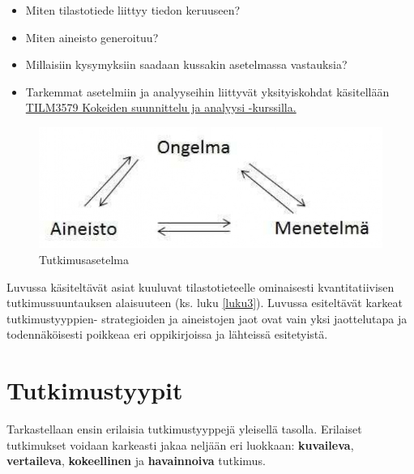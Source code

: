 \documentclass[
]{book}
\providecommand{\tightlist}{%
  \setlength{\itemsep}{0pt}\setlength{\parskip}{0pt}}
\begin{document}
\begin{itemize}
\tightlist
\item
  Miten tilastotiede liittyy tiedon keruuseen?
\item
  Miten aineisto generoituu?
\item
  Millaisiin kysymyksiin saadaan kussakin asetelmassa vastauksia?
\item
  Tarkemmat asetelmiin ja analyyseihin liittyvät yksityiskohdat käsitellään \href{https://opas.peppi.utu.fi/fi/opintojakso/TILM3579/5081}{TILM3579 Kokeiden suunnittelu ja analyysi -kurssilla.}
\end{itemize}

\begin{figure}

{\centering \includegraphics[width=1\linewidth]{images/tutkimusasetelma} 

}

\caption{Tutkimusasetelma}\label{fig:tutkimusasetelma}
\end{figure}

Luvussa käsiteltävät asiat kuuluvat tilastotieteelle ominaisesti kvantitatiivisen tutkimussuuntauksen alaisuuteen (ks. luku \ref{luku3}). Luvussa esiteltävät karkeat tutkimustyyppien- strategioiden ja aineistojen jaot ovat vain yksi jaottelutapa ja todennäköisesti poikkeaa eri oppikirjoissa ja lähteissä esitetyistä.

\hypertarget{alaluku121}{%
\section{Tutkimustyypit}\label{alaluku121}}

Tarkastellaan ensin erilaisia tutkimustyyppejä yleisellä tasolla. Erilaiset tutkimukset voidaan karkeasti jakaa neljään eri luokkaan: \textbf{kuvaileva}, \textbf{vertaileva}, \textbf{kokeellinen} ja \textbf{havainnoiva} tutkimus.
\end{document}
